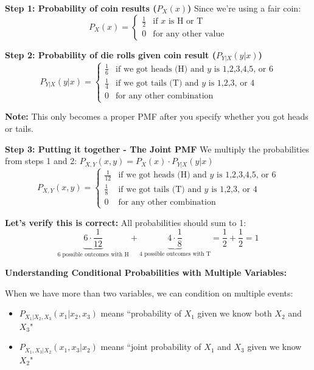 \documentclass{article}
\begin{document}
    \textbf{Step 1: Probability of coin results ($P_X(x)$)}
    Since we're using a fair coin:
    \[ P_X(x) = \begin{cases}
        \frac{1}{2} & \text{if } x \text{ is H or T} \\
        0 & \text{for any other value}
    \end{cases} \]

    \textbf{Step 2: Probability of die rolls given coin result ($P_{Y|X}(y|x)$)}
    \[ P_{Y|X}(y|x) = \begin{cases}
        \frac{1}{6} & \text{if we got heads (H) and } y \text{ is 1,2,3,4,5, or 6} \\
        \frac{1}{4} & \text{if we got tails (T) and } y \text{ is 1,2,3, or 4} \\
        0 & \text{for any other combination}
    \end{cases} \]

    \textbf{Note:} This only becomes a proper PMF after you specify whether you got heads or tails.

    \textbf{Step 3: Putting it together - The Joint PMF}
    We multiply the probabilities from steps 1 and 2:
    $P_{X,Y}(x,y) = P_X(x) \cdot P_{Y|X}(y|x)$
    \[ P_{X,Y}(x,y) = \begin{cases}
        \frac{1}{12} & \text{if we got heads (H) and } y \text{ is 1,2,3,4,5, or 6} \\
        \frac{1}{8} & \text{if we got tails (T) and } y \text{ is 1,2,3, or 4} \\
        0 & \text{for any other combination}
    \end{cases} \]

    \textbf{Let's verify this is correct:} 
    All probabilities should sum to 1:
    \[ \underbrace{6 \cdot \frac{1}{12}}_{\text{6 possible outcomes with H}} + \underbrace{4 \cdot \frac{1}{8}}_{\text{4 possible outcomes with T}} = \frac{1}{2} + \frac{1}{2} = 1 \]

    \noindent
    \textbf{Understanding Conditional Probabilities with Multiple Variables:}
    
    When we have more than two variables, we can condition on multiple events:
    \begin{itemize}
        \item $P_{X_1|X_2,X_3}(x_1|x_2,x_3)$ means ``probability of $X_1$ given we know both $X_2$ and $X_3$"
        \item $P_{X_1,X_3|X_2}(x_1,x_3|x_2)$ means ``joint probability of $X_1$ and $X_3$ given we know $X_2$"
    \end{itemize}
\end{document}
